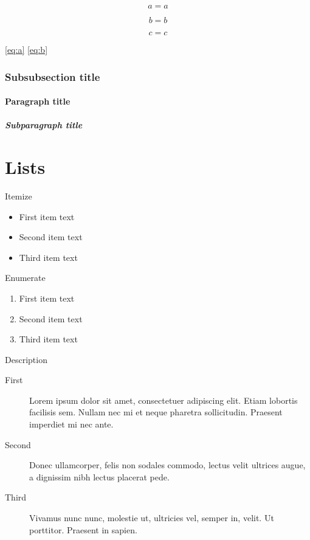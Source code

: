 \documentclass[italian,english,counters by chapter]{uniud}
\begin{document}
\blindtext

\begin{equation}
	\label{eq:a}
	a = a
\end{equation}

\begin{equation}
	\label{eq:b}
	\tag{$\dagger$}
	b = b
\end{equation}

\begin{equation}
	\label{eq:c}
	c = c
\end{equation}

\eqref{eq:a}
\eqref{eq:b}


\subsubsection{Subsubsection title}

\blindtext

\paragraph{Paragraph title}

\blindtext

\subparagraph{Subparagraph title}

\blindtext

\section{Lists}


Itemize
\begin{itemize}
\item First item text
\item Second item text
\item Third item text
\end{itemize}
Enumerate
\begin{enumerate}
\item First item text
\item Second item text
\item Third item text
\end{enumerate}
Description
\begin{description}
\item[First] 
	Lorem ipsum dolor sit amet, consectetuer adipiscing elit. Etiam lobortis facilisis sem. Nullam nec mi et neque pharetra sollicitudin. Praesent imperdiet mi nec ante.
\item[Second] 
	 Donec ullamcorper, felis non sodales commodo, lectus velit ultrices augue, a dignissim nibh lectus placerat pede.
\item[Third] 
	Vivamus nunc nunc, molestie ut, ultricies vel, semper in, velit. Ut porttitor. Praesent in sapien.
\end{description}
\end{document}
